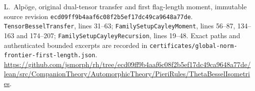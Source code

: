 L.~Alp\"oge, original dual-tensor transfer and first flag-length
moment, immutable source revision
\texttt{ecd09ff9b4aaf6c08f2b5ef17dc49ca9648a77de}.
\texttt{TensorBesselTransfer}, lines 31--63;
\texttt{FamilySetupCayleyMoment}, lines 56--87, 134--163 and
174--207; \texttt{FamilySetupCayleyRecursion}, lines 19--48.
Exact paths and authenticated bounded excerpts are recorded in
\texttt{certificates/global-norm-frontier-first-length.json}.
\url{https://github.com/jsmorph/rh/tree/ecd09ff9b4aaf6c08f2b5ef17dc49ca9648a77de/lean/src/CompanionTheory/AutomorphicTheory/PieriRules/ThetaBesselIsometries}.
